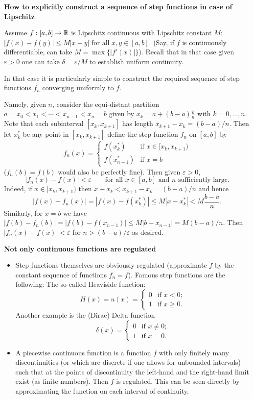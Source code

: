 \documentclass[10pt, a4paper]{article}
\begin{document}
\textbf{How to explicitly construct a sequence of step functions in case of Lipschitz}

Assume $f : [a, b] \rightarrow \mathbb{R}$ is Lipschitz continuous with Lipschitz constant $M$:
$|f(x) - f(y)| \leq M|x - y|$ for all $x, y \in [a, b]$.
(Say,
if $f$ is continuously differentiable,
can take $M = \max\{|f'(x)|\}$).
Recall that in that case given $\varepsilon > 0$ one can take $\delta = \varepsilon / M$ to establish uniform continuity.

In that case it is particularly simple to construct the required sequence of step functions $f_n$ converging uniformly to $f$.

Namely,
given $n$,
consider the equi-distant partition $a = x_0 < x_1 < \dotsi < x_{n - 1} < x_n = b$ given by $x_k = a + (b - a)\frac{k}{n}$ with $k = 0, \dotsc, n$.
Note that each subinterval $[x_k, x_{k + 1}]$ has length $x_{k + 1} - x_k = (b - a) / n$.
Then let $x_k ^ {*}$ be any point in $[x_k, x_{k + 1}]$ define the step function $f_n$ on $[a, b]$ by
\[
f_n(x) = \begin{cases}
    f(x_k ^ {*}) &\text{if } x \in [x_k, x_{k + 1}) \\
    f(x_{n - 1} ^ {*}) &\text{if } x = b
\end{cases}
\]
($f_n(b) = f(b)$ would also be perfectly fine).
Then given $\varepsilon > 0$,
\[
|f_n(x) - f(x)| < \varepsilon\qquad\text{for all } x \in [a, b]\text{ and $n$ sufficiently large.}
\]
Indeed,
if $x \in [x_k, x_{k + 1})$ then $x - x_k < x_{k + 1} - x_k = (b - a) / n$ and hence
\[
|f(x) - f_n(x)| = |f(x) - f(x_k ^ {*})| \leq M|x - x_k ^ {*}| < M\frac{b - a}{n}.
\]
Similarly,
for $x = b$ we have $|f(b) - f_n(b)| = |f(b) - f(x_{n - 1})| \leq M|b - x_{n - 1}| = M(b - a) / n$.
Then $|f_n(x) - f(x)| < \varepsilon$ for $n > (b - a) / \varepsilon$ as desired.


\textbf{Not only continuous functions are regulated}
\begin{itemize}
    \item  Step functions themselves are obviously regulated
    (approximate $f$ by the constant sequence of functions $f_n = f$).
    Famous step functions are the following:
    The so-called Heaviside function:
    \[
    H(x) = u(x) = \begin{cases}
        0 & \text{if } x < 0; \\
        1 & \text{if } x \geq 0.
    \end{cases}
    \]
    Another example is the
    (Dirac)
    Delta function
    \[
    \delta(x) = \begin{cases}
        0 & \text{if } x \neq 0; \\
        1 & \text{if } x = 0.
    \end{cases}
    \]
    
    \item A piecewise continuous function is a function $f$ with only finitely many discontinuities
    (or which are discrete if one allows for unbounded intervals)
    such that at the points of discontinuity the left-hand and the right-hand limit exist
    (as finite numbers).
    Then $f$ is regulated.
    This can be seen directly by approximating the function on each interval of continuity.
\end{itemize}
\end{document}

